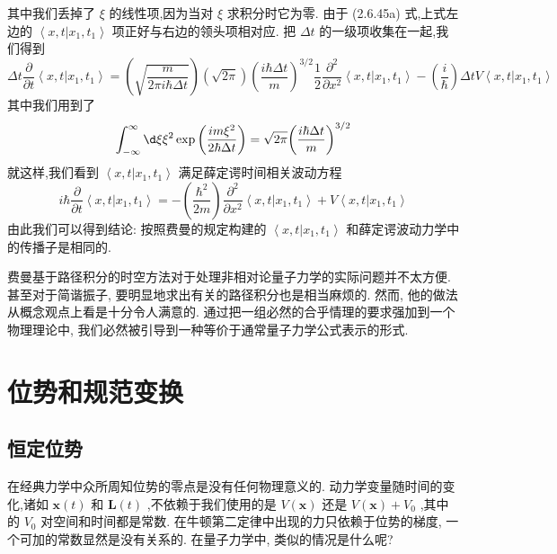 \documentclass[lang=cn,newtx,10pt,scheme=chinese,thmcnt=section]{elegantbook}
\begin{document}
其中我们丢掉了 $\xi$ 的线性项,因为当对 $\xi$ 求积分时它为零. 由于 (2.6.45a) 式,上式左边的 $\left\langle {x, t | {x}_{1},{t}_{1}}\right\rangle$ 项正好与右边的领头项相对应. 把 ${\Delta t}$ 的一级项收集在一起,我们得到
\begin{equation}
	{\Delta t}\frac{\partial }{\partial t}\left\langle {x, t | {x}_{1},{t}_{1}}\right\rangle = \left( \sqrt{\frac{m}{{2\pi i}\hbar {\Delta t}}}\right) \left( \sqrt{2\pi }\right) {\left( \frac{i\hbar {\Delta t}}{m}\right) }^{3/2}\frac{1}{2}\frac{{\partial }^{2}}{\partial {x}^{2}}\left\langle {x, t | {x}_{1},{t}_{1}}\right\rangle- \left( \frac{i}{\hbar }\right) {\Delta tV}\left\langle {x, t | {x}_{1},{t}_{1}}\right\rangle
\end{equation}
其中我们用到了
\begin{equation}
	\int_{-\infty }^{\infty }{\d \xi }{\xi }^{2}\exp \left( \frac{{im}{\xi }^{2}}{2\hbar {\Delta t}}\right) = \sqrt{2\pi }{\left( \frac{i\hbar {\Delta t}}{m}\right) }^{3/2}
\end{equation}
就这样,我们看到 $\left\langle {x, t | {x}_{1},{t}_{1}}\right\rangle$ 满足薛定谔时间相关波动方程
\begin{equation}
	i\hbar \frac{\partial }{\partial t}\left\langle {x, t | {x}_{1},{t}_{1}}\right\rangle = - \left( \frac{{\hbar }^{2}}{2m}\right) \frac{{\partial }^{2}}{\partial {x}^{2}}\left\langle {x, t | {x}_{1},{t}_{1}}\right\rangle + V\left\langle {x, t | {x}_{1},{t}_{1}}\right\rangle
\end{equation}
由此我们可以得到结论: 按照费曼的规定构建的 $\left\langle {x, t | {x}_{1},{t}_{1}}\right\rangle$ 和薛定谔波动力学中的传播子是相同的.

费曼基于路径积分的时空方法对于处理非相对论量子力学的实际问题并不太方便. 甚至对于简谐振子, 要明显地求出有关的路径积分也是相当麻烦的. 然而, 他的做法从概念观点上看是十分令人满意的. 通过把一组必然的合乎情理的要求强加到一个物理理论中, 我们必然被引导到一种等价于通常量子力学公式表示的形式. 
\section{位势和规范变换}
\subsection*{恒定位势}
在经典力学中众所周知位势的零点是没有任何物理意义的. 动力学变量随时间的变化,诸如 $\mathbf{x}\left( t\right)$ 和 $\mathbf{L}\left( t\right)$ ,不依赖于我们使用的是 $V\left( \mathbf{x}\right)$ 还是 $V\left( \mathbf{x}\right) + {V}_{0}$ ,其中的 ${V}_{0}$ 对空间和时间都是常数. 在牛顿第二定律中出现的力只依赖于位势的梯度, 一个可加的常数显然是没有关系的. 在量子力学中, 类似的情况是什么呢?
\end{document}
